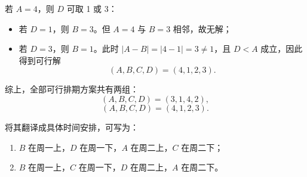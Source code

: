 \documentclass[a4paper]{article}
\begin{document}
\begin{enumerate}
\begin{solution}
若 \(A=4\)，则 \(D\) 可取 1 或 3：
\begin{itemize}
  \item 若 \(D=1\)，则 \(B=3\)。但 \(A=4\) 与 \(B=3\) 相邻，故无解；
  \item 若 \(D=3\)，则 \(B=1\)。此时 \(|A-B|=|4-1|=3\neq 1\)，且 \(D<A\) 成立，因此得到可行解
  \[
  (A,B,C,D)=(4,1,2,3).
  \]
\end{itemize}

综上，全部可行排期方案共有两组：
\[
(A,B,C,D)=(3,1,4,2),
\]
\[
(A,B,C,D)=(4,1,2,3).
\]

将其翻译成具体时间安排，可写为：
\begin{enumerate}[label=方案\arabic*：]
  \item \(B\) 在周一上，\(D\) 在周一下，\(A\) 在周二上，\(C\) 在周二下；
  \item \(B\) 在周一上，\(C\) 在周一下，\(D\) 在周二上，\(A\) 在周二下。
\end{enumerate}
\end{solution}

\end{enumerate}
\end{document}
